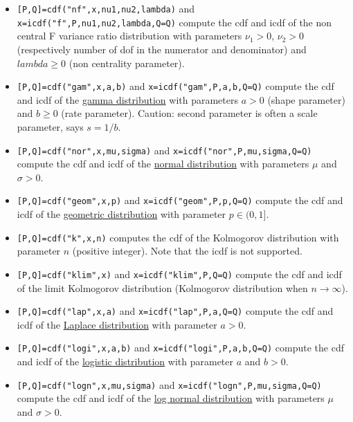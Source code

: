\begin{mandescription}
\begin{itemize}
\item {} \verb![P,Q]=cdf("nf",x,nu1,nu2,lambda)! and \verb!x=icdf("f",P,nu1,nu2,lambda,Q=Q)! compute
the cdf and icdf of the non central F variance ratio distribution with parameters $\nu_1 > 0$, $\nu_2 > 0$ 
(respectively number of dof in the numerator and denominator) and $lambda \ge 0$ (non  centrality parameter).


\item {} \verb![P,Q]=cdf("gam",x,a,b)! and  \verb!x=icdf("gam",P,a,b,Q=Q)! compute the cdf
 and icdf of the \hyperlink{gampdf}{gamma distribution} with parameters $a > 0$ (shape parameter) and $b \ge 0$
  (rate parameter). Caution: second parameter is often a scale parameter, says $s = 1/b$.


\item {} \verb![P,Q]=cdf("nor",x,mu,sigma)! and \verb!x=icdf("nor",P,mu,sigma,Q=Q)! compute
the cdf and icdf of the  \hyperlink{norpdf}{normal distribution} with parameters $\mu$ and $\sigma > 0$.


\item {} \verb![P,Q]=cdf("geom",x,p)! and \verb!x=icdf("geom",P,p,Q=Q)! compute
the cdf and icdf of the \hyperlink{geompdf}{geometric distribution} with parameter $p \in (0,1]$.

\item {} \verb![P,Q]=cdf("k",x,n)! computes the cdf of the Kolmogorov distribution 
with parameter $n$ (positive integer). Note that the icdf is not supported.

\item {} \verb![P,Q]=cdf("klim",x)! and  \verb!x=icdf("klim",P,Q=Q)! compute the cdf 
and icdf of the limit Kolmogorov distribution (Kolmogorov distribution when $n \rightarrow \infty$). 

\item {} \verb![P,Q]=cdf("lap",x,a)! and \verb!x=icdf("lap",P,a,Q=Q)! compute the cdf
and icdf of the \hyperlink{lappdf}{Laplace distribution} with parameter $a > 0$.

\item {} \verb![P,Q]=cdf("logi",x,a,b)! and \verb!x=icdf("logi",P,a,b,Q=Q)! compute the
cdf and icdf of the \hyperlink{logipdf}{logistic distribution} with parameter $a$ and $b > 0$.

\item {} \verb![P,Q]=cdf("logn",x,mu,sigma)! and  \verb!x=icdf("logn",P,mu,sigma,Q=Q)! compute
the cdf and icdf of the  \hyperlink{lognpdf}{log normal distribution} with parameters $\mu$ and $\sigma > 0$.


\end{itemize}
\end{mandescription}

